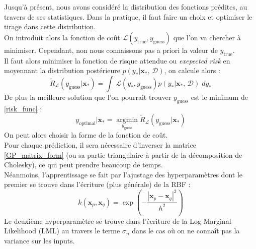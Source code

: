 \documentclass[a4paper,12pt]{report}
\newcommand{\argmin}{\mathop{\mathrm{argmin}}}
\newcommand{\bepar}[1]{
	\left( #1 \right)  
}
\numberwithin{equation}{section} %
\begin{document}
\noindent Jusqu'à présent, nous avons considéré la distribution des fonctions prédites, au travers de ses statistiques. Dans la pratique, il faut faire un choix et optimiser le tirage dans cette distribution.\\
On introduit alors la fonction de coût $\mathcal{L}\bepar{y_{\text{true}}, y_{\text{guess}}}$ que l'on va chercher à minimiser. Cependant, non nous connaissons pas a priori la valeur de $y_{\text{true}}$. \\
Il faut alors minimiser la fonction de risque attendue ou \textit{exepected risk} en moyennant la distribution postérieure $p\bepar{y_*|\textbf{x}_*, \, \mathcal{D}}$, on calcule alors :
\begin{equation}
\tilde{R}_\mathcal{L} \bepar{y_{\text{guess}}| \textbf{x}_*} = \int\, \mathcal{L}\bepar{y_*, y_{\text{guess}}} p\bepar{y_*|\textbf{x}_*, \, \mathcal{D}}\; dy_* \label{risk_func}
\end{equation}
De plus la meilleure solution que l'on pourrait trouver $y_{\text{guess}}$ est le minimum de \eqref{risk_func} :
\begin{equation}
y_{\text{optimal}} | \textbf{x}_* = \underset{y_{\text{guess}}}{\argmin} \tilde{R}_\mathcal{L}\bepar{y_{\text{guess}}|\textbf{x}_*}
\end{equation}
On peut alors choisir la forme de la fonction de coût. \\
Pour chaque prédiction, il sera nécessaire d'inverser la matrice \eqref{GP_matrix_form} (ou sa partie triangulaire à partir de la décomposition de Cholesky), ce qui peut prendre beaucoup de temps.\\
Néanmoins, l'apprentissage se fait par l'ajustage des hyperparamètres dont le premier se trouve dans l'écriture (plus générale) de la RBF : 
\begin{equation}
 k\bepar{\textbf{x}_p, \textbf{x}_q} = \exp{\bepar{-\frac{\left| \textbf{x}_p  - \textbf{x}_q\right|^2}{h^2}}}
\end{equation}
Le deuxième hyperparamètre se trouve dans l'écriture de la Log Marginal Likelihood (LML) au travers le terme $\sigma_n$ dans le cas où on ne connaît pas la variance sur les inputs.
\end{document}
